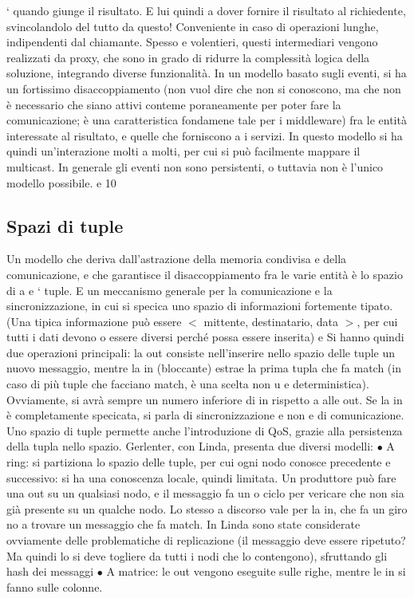 \documentclass[a4paper,12pt]{article}
\begin{document}
`
quando giunge il risultato. E lui quindi a dover fornire il risultato al
richiedente, svincolandolo del tutto da questo! Conveniente in caso di
operazioni lunghe, indipendenti dal chiamante.
Spesso e volentieri, questi intermediari vengono realizzati da proxy, che sono in
grado di ridurre la complessità logica della soluzione, integrando diverse funzionalità.
In un modello basato sugli eventi, si ha un fortissimo disaccoppiamento (non
vuol dire che non si conoscono, ma che non è necessario che siano attivi conteme
poraneamente per poter fare la comunicazione; è una caratteristica fondamene
tale per i middleware) fra le entità interessate al risultato, e quelle che forniscono
a
i servizi. In questo modello si ha quindi un'interazione molti a molti, per cui si
può facilmente mappare il multicast. In generale gli eventi non sono persistenti,
o
tuttavia non è l'unico modello possibile.
e
10
\subsection{Spazi di tuple}
Un modello che deriva dall'astrazione della memoria condivisa e della comunicazione, e che garantisce il
disaccoppiamento fra le varie entità è lo spazio di
a e
`
tuple. E un meccanismo generale per la comunicazione e la sincronizzazione, in
cui si specica uno spazio di informazioni fortemente tipato. (Una tipica informazione può essere $<$ mittente,
destinatario, data $>$, per cui tutti i dati devono
o
essere diversi perché possa essere inserita)
e
Si hanno quindi due operazioni principali: la out consiste nell'inserire nello
spazio delle tuple un nuovo messaggio, mentre la in (bloccante) estrae la prima
tupla che fa match (in caso di più tuple che facciano match, è una scelta non
u
e
deterministica). Ovviamente, si avrà sempre un numero inferiore di in rispetto
a
alle out. Se la in è completamente specicata, si parla di sincronizzazione e non
e
di comunicazione. Uno spazio di tuple permette anche l'introduzione di QoS,
grazie alla persistenza della tupla nello spazio.
Gerlenter, con Linda, presenta due diversi modelli:
$\bullet$ A ring: si partiziona lo spazio delle tuple, per cui ogni nodo conosce
precedente e successivo: si ha una conoscenza locale, quindi limitata. Un
produttore può fare una out su un qualsiasi nodo, e il messaggio fa un
o
ciclo per vericare che non sia già presente su un qualche nodo. Lo stesso
a
discorso vale per la in, che fa un giro no a trovare un messaggio che fa
match. In Linda sono state considerate ovviamente delle problematiche
di replicazione (il messaggio deve essere ripetuto? Ma quindi lo si deve
togliere da tutti i nodi che lo contengono), sfruttando gli hash dei messaggi
$\bullet$ A matrice: le out vengono eseguite sulle righe, mentre le in si fanno sulle
colonne.
\end{document}
